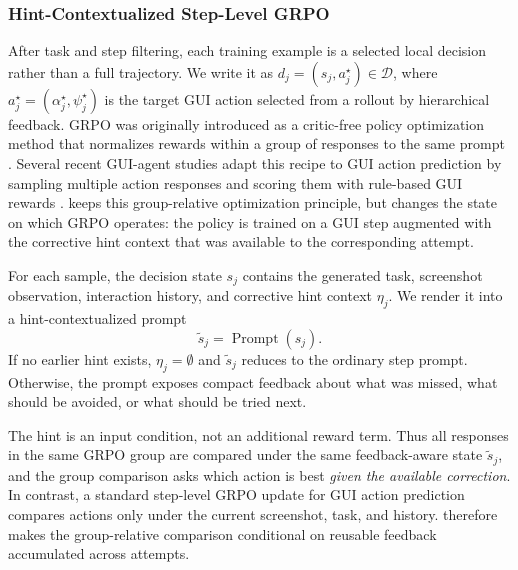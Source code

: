 \subsubsection{Hint-Contextualized Step-Level GRPO}

After task and step filtering, each training example is a selected local decision rather than a full trajectory. We write it as $d_j=(s_j,a_j^\star)\in\mathcal{D}$, where $a_j^\star=(\alpha_j^\star,\psi_j^\star)$ is the target GUI action selected from a rollout by hierarchical feedback. GRPO was originally introduced as a critic-free policy optimization method that normalizes rewards within a group of responses to the same prompt \citep{shao2024deepseekmath}. Several recent GUI-agent studies adapt this recipe to GUI action prediction by sampling multiple action responses and scoring them with rule-based GUI rewards \citep{lu2025ui,shi2025mobilegui}. \hifpo keeps this group-relative optimization principle, but changes the state on which GRPO operates: the policy is trained on a GUI step augmented with the corrective hint context that was available to the corresponding attempt.

For each sample, the decision state $s_j$ contains the generated task, screenshot observation, interaction history, and corrective hint context $\eta_j$. We render it into a hint-contextualized prompt
\begin{equation}
\label{eq:hint-prompt}
    \tilde{s}_j
    =\operatorname{Prompt}(s_j).
\end{equation}
If no earlier hint exists, $\eta_j=\emptyset$ and $\tilde{s}_j$ reduces to the ordinary step prompt. Otherwise, the prompt exposes compact feedback about what was missed, what should be avoided, or what should be tried next.

The hint is an input condition, not an additional reward term. Thus all responses in the same GRPO group are compared under the same feedback-aware state $\tilde{s}_j$, and the group comparison asks which action is best \emph{given the available correction}. In contrast, a standard step-level GRPO update for GUI action prediction compares actions only under the current screenshot, task, and history. \hifpo therefore makes the group-relative comparison conditional on reusable feedback accumulated across attempts.

